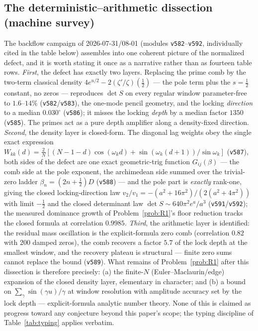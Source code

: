 \documentclass[11pt,a4paper]{article}
\theoremstyle{plain}
\theoremstyle{definition}
\begin{document}
\subsection{The deterministic--arithmetic dissection (machine survey)}
\label{sec:dissection}

The backflow campaign of 2026-07-31/08-01 (modules \texttt{v582}--\texttt{v592},
individually cited in the table below) assembles into one coherent picture of
the normalized defect, and it is worth stating it once as a narrative rather
than as fourteen table rows.  \emph{First}, the defect has exactly two layers.
Replacing the prime comb by the two-term classical density
$4e^{u/2}-2(\zeta'/\zeta)(\tfrac12)$ --- the pole term plus the $s=\tfrac12$
constant, no zeros --- reproduces $\det S$ on every regular window
parameter-free to $1.6$--$14\%$ (\texttt{v582}/\texttt{v583}), the one-mode
pencil geometry, and the locking \emph{direction} to a median $0.030^\circ$
(\texttt{v586}); it misses the locking \emph{depth} by a median factor $1350$
(\texttt{v585}).  The primes act as a pure depth amplifier along a
density-fixed direction.  \emph{Second}, the density layer is closed-form.
The diagonal lag weights obey the single exact expression
$W_{kk}(d)=\tfrac{2}{N}[(N{-}1{-}d)\cos(\omega_kd)+\sin(\omega_k(d{+}1))/\sin\omega_k]$
(\texttt{v587}), both sides of the defect are one exact geometric-trig
function $G_{ij}(\beta)$ --- the comb side at the pole exponent, the
archimedean side summed over the trivial-zero ladder $\beta_n=(2n{+}\tfrac12)D$
(\texttt{v588}) --- and the pole part is \emph{exactly} rank-one, giving the
closed locking-direction law $v_2/v_1=-(a^2{+}16\pi^2)/(2(a^2{+}4\pi^2))$ with
limit $-\tfrac12$ and the closed determinant law
$\det S\sim640\pi^2e^a/a^3$ (\texttt{v591}/\texttt{v592}); the measured
dominance growth of Problem~\ref{prob:R1}'s floor reduction tracks the closed
formula at correlation $0.9985$.  \emph{Third}, the arithmetic layer is
identified: the residual mass oscillation is the explicit-formula zero comb
(correlation $0.82$ with $200$ damped zeros), the comb recovers a factor $5.7$
of the lock depth at the smallest window, and the recovery plateau is
structural --- finite zero sums cannot replace the bound (\texttt{v589}).
What remains of Problem~\ref{prob:R1} after this dissection is therefore
precisely: (a) the finite-$N$ (Euler--Maclaurin/edge) expansion of the closed
density layer, elementary in character; and (b) a bound on
$\sum_\gamma\sin(\gamma u)/\gamma$ at window resolution with amplitude
accuracy set by the lock depth --- explicit-formula analytic number theory.
None of this is claimed as progress toward any conjecture beyond this paper's
scope; the typing discipline of Table~\ref{tab:typing} applies verbatim.
\end{document}
